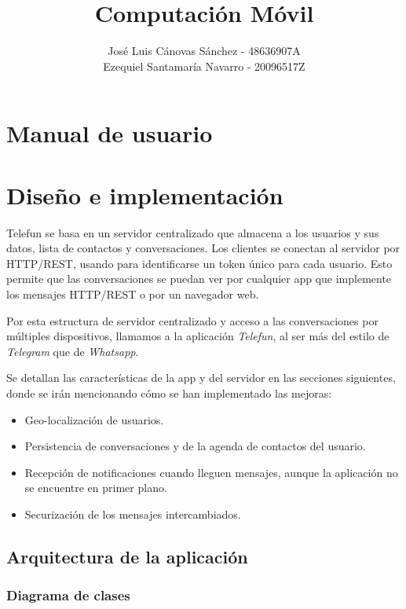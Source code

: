 \documentclass[]{article}
\title{Computación Móvil}
\author{José Luis Cánovas Sánchez - 48636907A\\Ezequiel Santamaría Navarro - 20096517Z}
\begin{document}
\maketitle


\tableofcontents

\section{Manual de usuario}

\section{Diseño e implementación}

Telefun se basa en un servidor centralizado que almacena a los usuarios y sus datos, lista de contactos y conversaciones. Los clientes se conectan al servidor por HTTP/REST, usando para identificarse un token único para cada usuario. Esto permite que las conversaciones se puedan ver por cualquier app que implemente los mensajes HTTP/REST o por un navegador web.

Por esta estructura de servidor centralizado y acceso a las conversaciones por múltiples dispositivos, llamamos a la aplicación \textit{Telefun}, al ser más del estilo de \textit{Telegram} que de \textit{Whatsapp}.

Se detallan las características de la app y del servidor en las secciones siguientes, donde se irán mencionando cómo se han implementado las mejoras:
\begin{itemize}
	\item Geo-localización de usuarios.
	\item Persistencia de conversaciones y de la agenda de contactos del usuario.
	\item Recepción de notificaciones cuando lleguen mensajes, aunque la aplicación no se encuentre en primer plano.
	\item Securización de los mensajes intercambiados.
\end{itemize}

\subsection{Arquitectura de la aplicación}


\subsubsection{Diagrama de clases}
\end{document}
